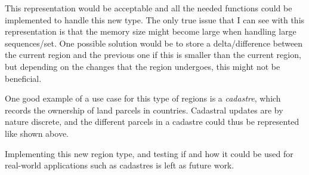 This representation would be acceptable and all the needed functions could be implemented to handle this new type. The only true issue that I can see with this representation is that the memory size might become large when handling large sequences/set. One possible solution would be to store a delta/difference between the current region and the previous one if this is smaller than the current region, but depending on the changes that the region undergoes, this might not be beneficial.

One good example of a use case for this type of regions is a \textit{cadastre}, which records the ownership of land parcels in countries. Cadastral updates are by nature discrete, and the different parcels in a cadastre could thus be represented like shown above.

Implementing this new region type, and testing if and how it could be used for real-world applications such as cadastres is left as future work.
